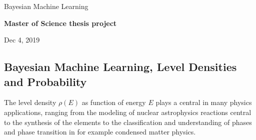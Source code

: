 \documentclass[%
oneside,                 %
final,                   %
10pt]{article}
\begin{document}

\newcommand{\exercisesection}[1]{\subsection*{#1}}






\thispagestyle{empty}

\begin{center}
{\LARGE\bf
\begin{spacing}{1.25}
Bayesian Machine Learning
\end{spacing}
}
\end{center}


\begin{center}
{\bf Master of Science thesis project${}^{}$} \\ [0mm]
\end{center}

\begin{center}
\end{center}
    

\begin{center}
Dec 4, 2019
\end{center}

\vspace{1cm}


\subsection{Bayesian Machine Learning, Level Densities and Probability}

The level density $\rho(E)$ as function of energy $E$ plays a central in many
physics applications, ranging from the modeling of nuclear
astrophysics reactions central to the synthesis of the elements to the
classification and understanding of phases and phase transition in for example condensed matter
physics.
\end{document}
